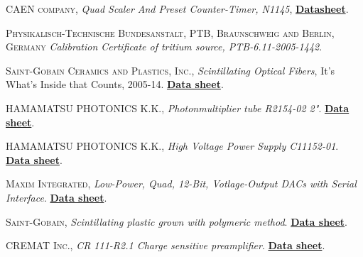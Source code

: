 \begin{thebibliography}{100}

 \textsc{CAEN company},
\textit{Quad Scaler And Preset Counter-Timer, N1145}, \href{https://www.caen.it/products/n1145/}{\textbf{Datasheet}}.

 \textsc{Physikalisch-Technische Bundesanstalt, PTB, Braunschweig and Berlin, Germany}
\textit{Calibration Certificate of tritium source, PTB-6.11-2005-1442}.

 \textsc{Saint-Gobain Ceramics and Plastics, Inc.},
\textit{Scintillating Optical Fibers}, It's What's Inside that Counts, 2005-14. \href{https://www.crystals.saint-gobain.com/products/scintillating-fiber}{\textbf{Data sheet}}. 

 \textsc{HAMAMATSU PHOTONICS K.K.},
\textit{Photonmultiplier tube R2154-02 2"}. \href{https://www.hamamatsu.com/eu/en/product/type/R2154-02/index.html}{\textbf{Data sheet}}.

 \textsc{HAMAMATSU PHOTONICS K.K.},
\textit{High Voltage Power Supply C11152-01}. \href{https://www.hamamatsu.com/jp/en/product/type/C11152-01/index.html}{\textbf{Data sheet}}.

 \textsc{Maxim Integrated},
\textit{Low-Power, Quad, 12-Bit, Votlage-Output DACs with Serial Interface}. \href{https://www.maximintegrated.com/en/products/analog/data-converters/digital-to-analog-converters/MAX5500.html}{\textbf{Data sheet}}.

 \textsc{Saint-Gobain},
\textit{Scintillating plastic grown with polymeric method}. \href{https://www.epic-crystal.com/others/plastic-scintillator.html}{\textbf{Data sheet}}.

 \textsc{CREMAT Inc.},
\textit{CR 111-R2.1 Charge sensitive preamplifier}. \href{https://www.cremat.com/home/charge-sensitive-preamplifiers/}{\textbf{Data sheet}}.


\end{thebibliography}
